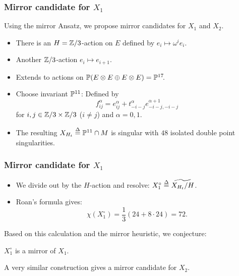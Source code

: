\begin{frame}
\frametitle{Mirror candidate for $X_1$}

Using the mirror Ansatz, we propose mirror candidates for $X_1$ and $X_2$.

\begin{itemize}
	\item
	There is an $H = \Z/3$-action on $E$ defined by $e_i \mapsto \omega^i e_i$.

	\item
	Another $\Z/3$-action $e_i \mapsto e_{i + 1}$.

	\item
	Extends to actions on $\P(E \otimes E \oplus E \otimes E)=\P^{17}\mkern-4mu$.

	\item
	Choose invariant $\P^{11}$: Defined by
	\[
	    f_{ij}^\alpha = e_{ij}^\alpha + t_{-i-j}^\alpha e_{-i-j,-i-j}^{\alpha+1}
	\]
	for $i,j \in \Z/3 \times \Z/3$ ($i \neq j$) and $\alpha = 0,1$.

	\item
	The resulting $X_{H_t} \defeq \P^{11} \cap M$ is singular with $48$ isolated double point singularities.
\end{itemize}

\end{frame}

\begin{frame}
\frametitle{Mirror candidate for $X_1$}

\begin{itemize}
	\item We divide out by the $H$-action and resolve: $X_1^\circ \defeq \widetilde{X_{H_t}/H}$.
	\item Roan's formula gives:
	\[
	    \chi(X_1^\circ) = \frac{1}{3} \left(24 + 8 \cdot 24\right) = 72.
	\]
\end{itemize}

Based on this calculation and the mirror heuristic, we conjecture:

\begin{conjecture}
    $X_1^\circ$ is a mirror of $X_1$.
\end{conjecture}

\begin{remark}
    A very similar construction gives a mirror candidate for $X_2$.
\end{remark}

\end{frame}
